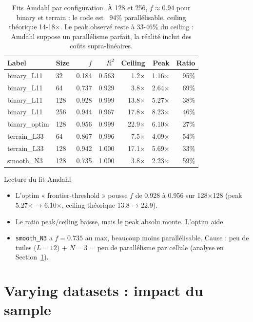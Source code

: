 \begin{table}[H]
\centering
\begin{tabular}{llrrrrr}
\toprule
\textbf{Label} & \textbf{Size} & \textbf{$f$} & \textbf{$R^2$} & \textbf{Ceiling} & \textbf{Peak} & \textbf{Ratio} \\
\midrule
binary\_L11 & 32 & 0.184 & 0.563 & 1.2× & 1.16× & 95\% \\
binary\_L11 & 64 & 0.737 & 0.929 & 3.8× & 2.64× & 69\% \\
binary\_L11 & 128 & 0.928 & 0.999 & 13.8× & 5.27× & 38\% \\
binary\_L11 & 256 & 0.944 & 0.967 & 17.8× & 8.23× & 46\% \\
binary\_optim & 128 & 0.956 & 0.999 & 22.9× & 6.10× & 27\% \\
terrain\_L33 & 64 & 0.867 & 0.996 & 7.5× & 4.09× & 54\% \\
terrain\_L33 & 128 & 0.942 & 1.000 & 17.1× & 5.69× & 33\% \\
smooth\_N3 & 128 & 0.735 & 1.000 & 3.8× & 2.23× & 59\% \\
\bottomrule
\end{tabular}
\caption{Fits Amdahl par configuration. À 128 et 256, $f \approx 0.94$ pour binary et terrain : le code est ~94\% parallélisable, ceiling théorique 14-18×. Le peak observé reste à 33-46\% du ceiling : Amdahl suppose un parallélisme parfait, la réalité inclut des coûts supra-linéaires.}
\label{tab:res:amdahl}
\end{table}

\begin{important}{Lecture du fit Amdahl}
\begin{itemize}
    \item L'optim « frontier-threshold » pousse $f$ de 0.928 à 0.956 sur 128×128 (peak 5.27× → 6.10×, ceiling théorique 13.8 → 22.9).
    \item Le ratio peak/ceiling baisse, mais le peak absolu monte. L'optim aide.
    \item \texttt{smooth\_N3} a $f = 0.735$ au max, beaucoup moins parallélisable. Cause : peu de tuiles ($L=12$) + $N=3$ = peu de parallélisme par cellule (analyse en Section~\ref{sec:res:varying_datasets}).
\end{itemize}
\end{important}

\section{Varying datasets : impact du sample}
\label{sec:res:varying_datasets}

